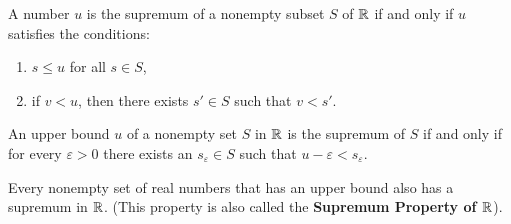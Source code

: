 \begin{lemma}
	A number $u$ is the supremum of a nonempty subset $S$ of $\mathbb{R}$ if and only if $u$ satisfies the conditions:
	\begin{enumerate}
		\item $s \leq u$ for all $s \in S$,
		\item if $v < u$, then there exists $s' \in S$ such that $v < s'$.
	\end{enumerate}
\end{lemma}

\begin{lemma}
	An upper bound $u$ of a nonempty set $S$ in $\mathbb{R}$ is the supremum of $S$ if and only if for every $\varepsilon > 0$ there exists an $s_\varepsilon \in S$ such that $u - \varepsilon < s_\varepsilon$.
\end{lemma}

\begin{theorem}
	Every nonempty set of real numbers that has an upper bound also has a supremum in $\mathbb{R}$. (This property is also called the \textbf{Supremum Property of $\mathbb{R}$}).
\end{theorem}
